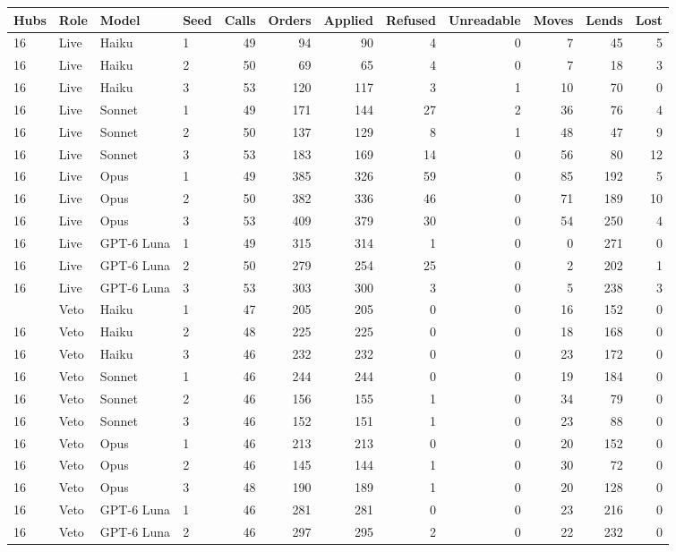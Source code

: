 \begin{tabular}{llllrrrrrrrr}
\toprule
Hubs & Role & Model & Seed & Calls & Orders & Applied & Refused & Unreadable & Moves & Lends & Lost \\
\midrule
16 & Live & Haiku & 1 & 49 & 94 & 90 & 4 & 0 & 7 & 45 & 5 \\
16 & Live & Haiku & 2 & 50 & 69 & 65 & 4 & 0 & 7 & 18 & 3 \\
16 & Live & Haiku & 3 & 53 & 120 & 117 & 3 & 1 & 10 & 70 & 0 \\
16 & Live & Sonnet & 1 & 49 & 171 & 144 & 27 & 2 & 36 & 76 & 4 \\
16 & Live & Sonnet & 2 & 50 & 137 & 129 & 8 & 1 & 48 & 47 & 9 \\
16 & Live & Sonnet & 3 & 53 & 183 & 169 & 14 & 0 & 56 & 80 & 12 \\
16 & Live & Opus & 1 & 49 & 385 & 326 & 59 & 0 & 85 & 192 & 5 \\
16 & Live & Opus & 2 & 50 & 382 & 336 & 46 & 0 & 71 & 189 & 10 \\
16 & Live & Opus & 3 & 53 & 409 & 379 & 30 & 0 & 54 & 250 & 4 \\
16 & Live & GPT-6 Luna & 1 & 49 & 315 & 314 & 1 & 0 & 0 & 271 & 0 \\
16 & Live & GPT-6 Luna & 2 & 50 & 279 & 254 & 25 & 0 & 2 & 202 & 1 \\
16 & Live & GPT-6 Luna & 3 & 53 & 303 & 300 & 3 & 0 & 5 & 238 & 3 \\
\addlinespace
16 & Veto & Haiku & 1 & 47 & 205 & 205 & 0 & 0 & 16 & 152 & 0 \\
16 & Veto & Haiku & 2 & 48 & 225 & 225 & 0 & 0 & 18 & 168 & 0 \\
16 & Veto & Haiku & 3 & 46 & 232 & 232 & 0 & 0 & 23 & 172 & 0 \\
16 & Veto & Sonnet & 1 & 46 & 244 & 244 & 0 & 0 & 19 & 184 & 0 \\
16 & Veto & Sonnet & 2 & 46 & 156 & 155 & 1 & 0 & 34 & 79 & 0 \\
16 & Veto & Sonnet & 3 & 46 & 152 & 151 & 1 & 0 & 23 & 88 & 0 \\
16 & Veto & Opus & 1 & 46 & 213 & 213 & 0 & 0 & 20 & 152 & 0 \\
16 & Veto & Opus & 2 & 46 & 145 & 144 & 1 & 0 & 30 & 72 & 0 \\
16 & Veto & Opus & 3 & 48 & 190 & 189 & 1 & 0 & 20 & 128 & 0 \\
16 & Veto & GPT-6 Luna & 1 & 46 & 281 & 281 & 0 & 0 & 23 & 216 & 0 \\
16 & Veto & GPT-6 Luna & 2 & 46 & 297 & 295 & 2 & 0 & 22 & 232 & 0 \\

\end{tabular}
